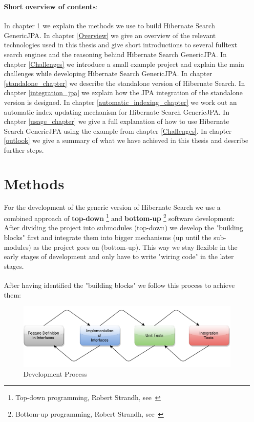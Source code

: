 \pagebreak

\noindent
\textbf{Short overview of contents}:
\\\\
\noindent
In chapter \ref{Methods} we explain the methods we use to build Hibernate Search GenericJPA. In chapter \ref{Overview} we give an overview of the relevant technologies used in this thesis and give short introductions to several fulltext search engines and the reasoning behind Hibernate Search GenericJPA. In chapter \ref{Challenges} we introduce a small example project and explain the main challenges while developing Hibernate Search GenericJPA. In chapter \ref{standalone_chapter} we describe the standalone version of Hibernate Search. In chapter \ref{integration_jpa} we explain how the JPA integration of the standalone version is designed. In chapter \ref{automatic_indexing_chapter} we work out an automatic index updating mechanism for Hibernate Search GenericJPA. In chapter \ref{usage_chapter} we give a full explanation of how to use Hibernate Search GenericJPA using the example from chapter \ref{Challenges}. In chapter \ref{outlook} we give a summary of what we have achieved in this thesis and describe further steps.

\pagebreak

\pagebreak

\section{Methods} \label{Methods}

For the development of the generic version of Hibernate Search we use a combined approach of \textbf{top-down} \footnote{Top-down programming, Robert Strandh, see~\cite{top_down_strandh}} and \textbf{bottom-up} \footnote{Bottom-up programming, Robert Strandh, see~\cite{bottom_up_strandh}} software development: After dividing the project into submodules (top-down) we develop the "building blocks"  first and integrate them into bigger mechanisms (up until the sub-modules) as the project goes on (bottom-up). This way we stay flexible in the early stages of development and only have to write "wiring code" in the later stages.
\\\\
After having identified the "building blocks" we follow this process to achieve them:

\begin{figure}[ht]
	\centering
	\includegraphics[scale=0.52]{images/work_process.pdf}
	\caption{Development Process}
	\label{development_process_of_a_feature}
\end{figure}

